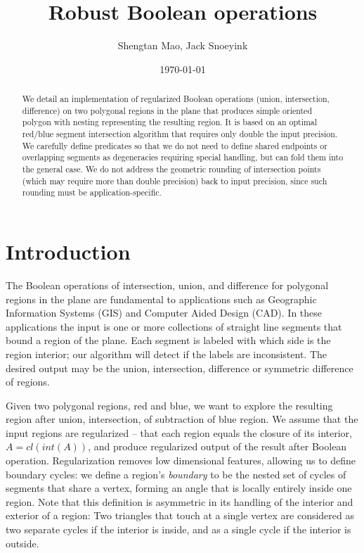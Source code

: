 \documentclass[11pt]{article}
\title{Robust Boolean operations}
\author{Shengtan Mao, Jack Snoeyink}
\date{\today}
\begin{document}
\maketitle
\begin{abstract}
We detail an implementation of regularized Boolean operations (union, intersection, difference) on two polygonal regions in the plane that produces simple oriented polygon with nesting representing the resulting region.
It is based on an optimal red/blue segment intersection algorithm that requires only double the input precision.  
We carefully define predicates so that we do not need to define shared endpoints or overlapping segments as degeneracies requiring special handling, but can fold them into the general case.  
We do not address the geometric rounding of intersection points (which may require more than double precision) back to input precision, since such rounding must be application-specific.
\end{abstract}
\section{Introduction}

The Boolean operations of intersection, union, and difference for polygonal regions in the plane are fundamental to applications such as Geographic Information Systems (GIS)
and Computer Aided Design (CAD).  
In these applications the input is one or more collections of straight line segments that bound a region of the plane.
Each segment is labeled with which side is the region interior; our algorithm will detect if the labels are inconsistent.
The desired output may be the union, intersection, difference or symmetric difference of regions. 

Given two polygonal regions, red and blue, we want to explore the resulting region after union, intersection, of subtraction of blue region.
We assume that the input regions are regularized -- that each region equals the closure of its interior, $A= \textit{cl}(\textit{int}(A))$, and produce regularized output of the result after Boolean operation. 
Regularization removes low dimensional features, allowing us to define boundary cycles: we define a region's \textit{boundary} to be the nested set of cycles of segments that share a vertex, forming an angle that is locally entirely inside one region.
Note that this definition is asymmetric in its handling of the interior and exterior of a region:  Two triangles that touch at a single vertex are considered as two separate cycles if the interior is inside, and as a single cycle if the interior is outside.
\end{document}
